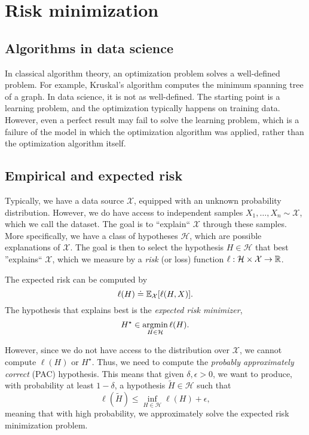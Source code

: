 \section{Risk minimization}

\subsection{Algorithms in data science}

In classical algorithm theory, an optimization problem solves a well-defined problem. For example,
Kruskal's algorithm computes the minimum spanning tree of a graph. In data science, it is not as
well-defined. The starting point is a learning problem, and the optimization typically happens on
training data. However, even a perfect result may fail to solve the learning problem, which is a
failure of the model in which the optimization algorithm was applied, rather than the optimization
algorithm itself.

\subsection{Empirical and expected risk}

Typically, we have a data source $\mathcal{X}$, equipped with an unknown probability distribution.
However, we do have access to independent samples $X_1,\ldots,X_n \sim \mathcal{X}$, which we call
the dataset. The goal is to ``explain`` $\mathcal{X}$ through these samples. More specifically, we
have a class of hypotheses $\mathcal{H}$, which are possible explanations of $\mathcal{X}$. The
goal is then to select the hypothesis $H\in \mathcal{H}$ that best ''explains`` $\mathcal{X}$,
which we measure by a \textit{risk} (or loss) function $\ell: \mathcal{H}\times \mathcal{X}\to \mathbb{R}$.

The expected risk can be computed by \[
    \ell(H) \doteq \mathbb{E}_{\mathcal{X}}[\ell(H, X)].
\]
The hypothesis that explains best is the \textit{expected risk minimizer}, \[
    H^\star \in \operatorname*{argmin}_{H\in \mathcal{H}} \ell(H).
\]

However, since we do not have access to the distribution over $\mathcal{X}$, we cannot compute
$\ell(H)$ or $H^\star$. Thus, we need to compute the \textit{probably approximately correct} (PAC)
hypothesis. This means that given $\delta,\epsilon > 0$, we want to produce, with probability at
least $1-\delta$, a hypothesis $\tilde{H}\in \mathcal{H}$ such that \[
    \ell(\tilde{H}) \leq \inf_{H\in \mathcal{H}} \ell(H) + \epsilon,
\]
meaning that with high probability, we approximately solve the expected risk minimization problem.

